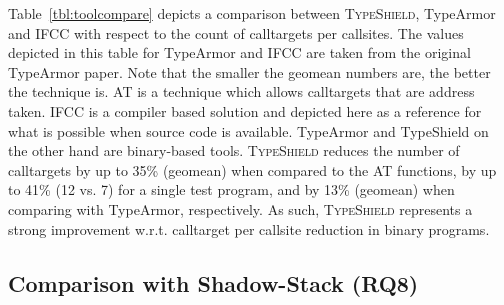 Table~\ref{tbl:toolcompare} depicts 
a comparison between \textsc{TypeShield}, TypeArmor and IFCC with respect to the count of calltargets per callsites. 
The values depicted in this table for TypeArmor and IFCC are taken from the original TypeArmor paper.
Note that the smaller the geomean numbers are, the better the technique is. AT is a technique which allows calltargets that are address taken. 
IFCC is a compiler based solution and depicted here as a reference for what is possible when 
source code is available. TypeArmor and TypeShield on the other hand are binary-based tools. 
\textsc{TypeShield} reduces the number of calltargets by up to 35\% (geomean) when 
compared to the AT functions, by up to 41\% (12 vs. 7) for a single test program, and by 13\% (geomean) 
when comparing with TypeArmor, respectively.
As such, \textsc{TypeShield} represents a strong improvement w.r.t. calltarget per callsite reduction in binary programs.

\subsection{Comparison with Shadow-Stack (RQ8)}
\label{RQ10: Comparison with SafeStack}

